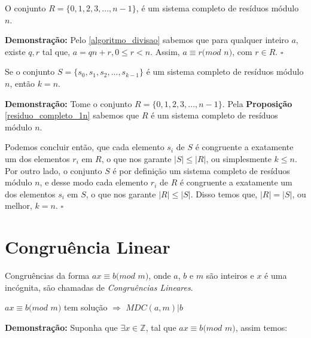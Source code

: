\begin{proposition}\label{residuo_completo_1n}
O conjunto $R = \{0, 1, 2, 3,...,n-1\}$, é um sistema completo de resíduos módulo $n$.
\end{proposition}
\textbf{Demonstração:}
Pelo \autoref{algoritmo_divisao} sabemos que para qualquer inteiro $a$, existe $q, r$ tal que, $a = qn + r, 0 \leq r < n$. Assim, $a\equiv r(mod$ $n)$, com $r \in R$. $\square$
\\

\begin{theorem}
Se o conjunto $S = \{s_0, s_1, s_2, ..., s_{k-1}\}$ é um sistema completo de resíduos módulo $n$, então $k=n$.
\end{theorem}
\textbf{Demonstração:}
Tome o conjunto $R = \{0, 1, 2, 3,...,n-1\}$. Pela \textbf{Proposição} \autoref{residuo_completo_1n} sabemos que $R$ é um sistema completo de resíduos módulo $n$.

Podemos concluir então, que cada elemento $s_i$ de $S$ é congruente a exatamente um dos elementos $r_i$ em $R$, o que nos garante $|S| \leq |R|$, ou simplesmente $k\leq n$. 
Por outro lado, o conjunto $S$ é por definição um sistema completo de resíduos módulo $n$, e desse modo cada elemento $r_i$ de $R$ é congruente a exatamente um dos elementos $s_i$ em $S$, o que nos garante $|R| \leq |S|$.
Disso temos que, $|R| = |S|$, ou melhor, $k=n$. $\square$
\\




\section{Congruência Linear}

\begin{definition}
Congruências da forma $ax \equiv b (mod$ $m)$, onde $a$, $b$ e $m$ são inteiros e $x$ é uma incógnita, são chamadas de \textit{Congruências Lineares}.
\end{definition}



\begin{proposition}\label{congruencia_linear_ida}
$ax \equiv b (mod$ $m)$ tem solução $\Rightarrow$ $MDC(a,m)|b$
\end{proposition}
\textbf{Demonstração:}
Suponha que $\exists x\in\mathbb{Z}$, tal que $ax\equiv b(mod$ $m)$, assim temos:

